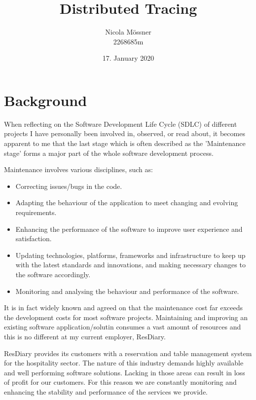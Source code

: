 \documentclass[11pt]{article}
\title{Distributed Tracing}
\author{Nicola M\"{o}ssner \\ 2268685m}
\date{17. January 2020}
\begin{document}
\maketitle

\section{Background}


When reflecting on the Software Development Life Cycle (SDLC) of different projects I have personally been involved in, observed, or read about, it becomes apparent to me that the last stage which is often described as the 'Maintenance stage' forms a major part of the whole software development process.


Maintenance involves various disciplines, such as: %
\begin{itemize}
    \item Correcting issues/bugs in the code.
    \item Adapting the behaviour of the application to meet changing and evolving requirements.
    \item Enhancing the performance of the software to improve user experience and satisfaction.
    \item Updating technologies, platforms, frameworks and infrastructure to keep up with the latest standards and innovations, and making necessary changes to the software accordingly.
    \item Monitoring and analysing the behaviour and performance of the software.
\end{itemize}
It is in fact widely known and agreed on that the maintenance cost far exceeds the development costs for most software projects. Maintaining and improving an existing software application/solutin consumes a vast amount of resources and this is no different at my current employer, ResDiary. %

ResDiary provides its customers with a reservation and table management system for the hospitality sector. The nature of this industry demands highly available and well performing software solutions. Lacking in those areas can result in loss of profit for our customers. For this reason we are constantly monitoring and enhancing the stability and performance of the services we provide.
\end{document}
